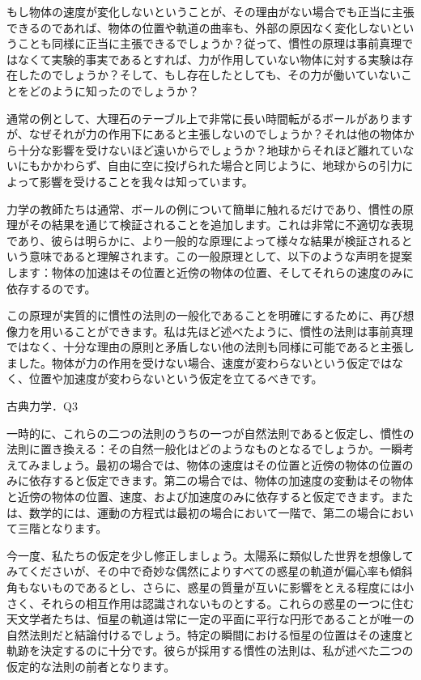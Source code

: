 \documentclass[a4paper,11pt,openany]{ltjsbook}
\begin{document}
もし物体の速度が変化しないということが、その理由がない場合でも正当に主張できるのであれば、物体の位置や軌道の曲率も、外部の原因なく変化しないということも同様に正当に主張できるでしょうか？従って、慣性の原理は事前真理ではなくて実験的事実であるとすれば、力が作用していない物体に対する実験は存在したのでしょうか？そして、もし存在したとしても、その力が働いていないことをどのように知ったのでしょうか？

通常の例として、大理石のテーブル上で非常に長い時間転がるボールがありますが、なぜそれが力の作用下にあると主張しないのでしょうか？それは他の物体から十分な影響を受けないほど遠いからでしょうか？地球からそれほど離れていないにもかかわらず、自由に空に投げられた場合と同じように、地球からの引力によって影響を受けることを我々は知っています。

力学の教師たちは通常、ボールの例について簡単に触れるだけであり、慣性の原理がその結果を通じて検証されることを追加します。これは非常に不適切な表現であり、彼らは明らかに、より一般的な原理によって様々な結果が検証されるという意味であると理解されます。この一般原理として、以下のような声明を提案します：物体の加速はその位置と近傍の物体の位置、そしてそれらの速度のみに依存するのです。

この原理が実質的に慣性の法則の一般化であることを明確にするために、再び想像力を用いることができます。私は先ほど述べたように、慣性の法則は事前真理ではなく、十分な理由の原則と矛盾しない他の法則も同様に可能であると主張しました。物体が力の作用を受けない場合、速度が変わらないという仮定ではなく、位置や加速度が変わらないという仮定を立てるべきです。

古典力学．Q3

一時的に、これらの二つの法則のうちの一つが自然法則であると仮定し、慣性の法則に置き換える：その自然一般化はどのようなものとなるでしょうか。一瞬考えてみましょう。最初の場合では、物体の速度はその位置と近傍の物体の位置のみに依存すると仮定できます。第二の場合では、物体の加速度の変動はその物体と近傍の物体の位置、速度、および加速度のみに依存すると仮定できます。または、数学的には、運動の方程式は最初の場合において一階で、第二の場合において三階となります。

今一度、私たちの仮定を少し修正しましょう。太陽系に類似した世界を想像してみてくださいが、その中で奇妙な偶然によりすべての惑星の軌道が偏心率も傾斜角もないものであるとし、さらに、惑星の質量が互いに影響をとえる程度には小さく、それらの相互作用は認識されないものとする。これらの惑星の一つに住む天文学者たちは、恒星の軌道は常に一定の平面に平行な円形であることが唯一の自然法則だと結論付けるでしょう。特定の瞬間における恒星の位置はその速度と軌跡を決定するのに十分です。彼らが採用する慣性の法則は、私が述べた二つの仮定的な法則の前者となります。
\end{document}
